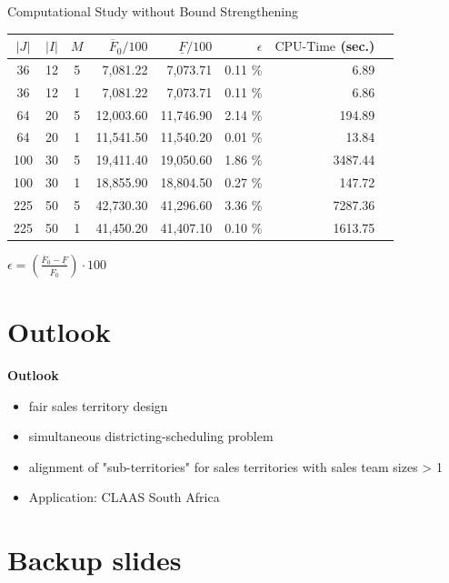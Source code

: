 \documentclass[xcolor=dvipsnames,aspectratio=169, handout, mathserif]{beamer}
\begin{document}
\begin{frame}{Computational Study without Bound Strengthening}
\begin{center}
    \small
    \begin{tabular}{cccrrrrr}
    \toprule
        $|J|$ & $|I|$ & $M$ & $\overline{F}_0/100$ & $\underline{F}/100$ & $\epsilon$ &  $\text{CPU-Time}$ (sec.)  \\ \midrule
        36 & 12 & 5 & 7,081.22 & 7,073.71 & 0.11 \%  & 6.89 \\
        36 & 12 & 1 & 7,081.22 & 7,073.71 & 0.11 \%   & 6.86  \\ \midrule
        64 & 20 & 5 & 12,003.60 & 11,746.90 & 2.14 \%  & 194.89  \\
        64 & 20 & 1 & 11,541.50 & 11,540.20 & 0.01 \% & 13.84 \\ \midrule
        100 & 30 & 5 & 19,411.40 & 19,050.60 & 1.86 \%  & 3487.44 \\
        100 & 30 & 1 & 18,855.90 & 18,804.50 & 0.27 \%  & 147.72 \\ \midrule 
        225 & 50 & 5 & 42,730.30 & 41,296.60 & 3.36 \%  & 7287.36  \\
        225 & 50 & 1 & 41,450.20 & 41,407.10 & 0.10 \%  & 1613.75  \\ \bottomrule
    \end{tabular}
\end{center}
$\epsilon=\left(\frac{\overline{F}_0-\underline{F}}{\overline{F}_0} \right) \cdot 100$
\end{frame}


\section{Outlook}


\begin{frame}{\textbf{Outlook}}
    \begin{itemize}[<+->]
     \item fair sales territory design
     \item simultaneous districting-scheduling problem
     \item alignment of "sub-territories" for sales territories with sales team sizes > 1
     \item Application: CLAAS South Africa
    \end{itemize}
\end{frame}


\appendix
\section{Backup slides}
\end{document}
